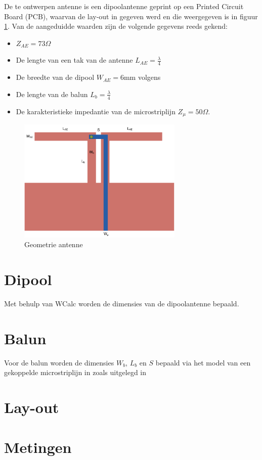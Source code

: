 De te ontwerpen antenne is een dipoolantenne geprint op een Printed Circuit Board (PCB), waarvan de
  lay-out in \cite{lesWendy} gegeven werd en die weergegeven is in figuur \ref{fig:antenne}. Van de
  aangeduidde waarden zijn de volgende gegevens reeds gekend:
  \begin{itemize}
    \item $Z_{AE} = 73 \Omega$
    \item De lengte van een tak van de antenne $L_{AE} = \frac{\lambda}{4}$
    \item De breedte van de dipool $W_{AE} = 6 \mbox{mm}$ volgens \cite{lesWendy}
    \item De lengte van de balun $L_b = \frac{\lambda}{4}$
    \item De karakteristieke impedantie van de microstriplijn $Z_{\mu} = 50 \Omega$.
  \end{itemize}
  
    \begin{figure}
      \centering
      \includegraphics[width=0.7\textwidth,keepaspectratio=true]{fig/antenna.pdf}
      \caption{Geometrie antenne}
      \label{fig:antenne}
    \end{figure}

\section{Dipool}
Met behulp van WCalc \cite{Wcalc} worden de dimensies van de dipoolantenne bepaald.

  
    
  

\section{Balun}
Voor de balun worden de dimensies $W_b$, $L_b$ en $S$ bepaald via het model van
een gekoppelde microstriplijn in \cite{Wcalc} zoals uitgelegd in \cite{Edward}

\section{Lay-out}

\section{Metingen}


